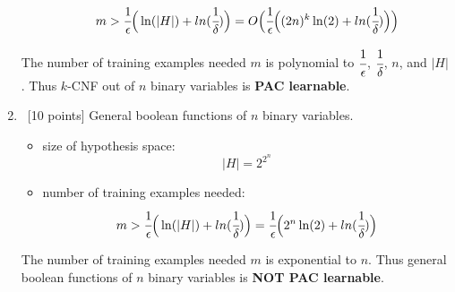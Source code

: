 \documentclass[12pt, fullpage,letterpaper]{article}
\begin{document}
\begin{enumerate}
\begin{itemize}
$$m>\cfrac{1}{\epsilon}\Big(\ln(|H|)+ln(\cfrac{1}{\delta})\Big)=O\Big(\cfrac{1}{\epsilon}\Big((2n)^k\ln(2)+ln(\cfrac{1}{\delta})\Big)\Big)$$
\end{itemize}
The number of training examples needed $m$ is polynomial to $\cfrac{1}{\epsilon}$, $\cfrac{1}{\delta}$, $n$, and $|H|$. Thus $k$-CNF out of $n$ binary variables is \textbf{PAC learnable}.
\item~[10 points] General boolean functions of $n$ binary variables. 
\begin{itemize}
\item size of hypothesis space: 
$$|H|=2^{2^n}$$
\item number of training examples needed: 
$$m>\cfrac{1}{\epsilon}\Big(\ln(|H|)+ln(\cfrac{1}{\delta})\Big)=\cfrac{1}{\epsilon}\Big(2^n\ln(2)+ln(\cfrac{1}{\delta})\Big)$$
\end{itemize}
The number of training examples needed $m$ is exponential to $n$. Thus general boolean functions of $n$ binary variables is \textbf{NOT PAC learnable}.
\end{enumerate}
\end{document}
